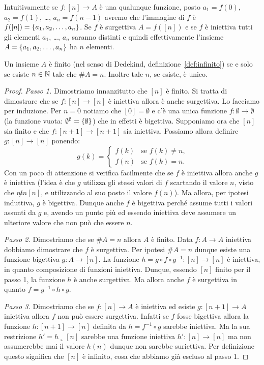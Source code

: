 Intuitivamente se $f\colon [n]\to A$ è una qualunque funzione, 
posto $a_1=f(0)$, $a_2=f(1)$, \dots, $a_{n}=f(n-1)$ 
avremo che l'immagine di $f$ è $f([n]) = {\left\{ a_1,a_2,\dots,a_n \right\}}$.
Se $f$ è surgettiva $A=f([n])$ e se $f$ è iniettiva 
tutti gli elementi $a_1$, \dots, $a_n$ saranno distinti
e quindi effettivamente l'insieme $A={\left\{ a_1,a_2,\dots,a_n \right\}}$
ha $n$ elementi.

\begin{theorem}
Un insieme $A$ è finito
(nel senso di Dedekind, definizione~\ref{def:infinito})
se e solo se esiste $n\in {\mathbb N}$ tale che $\#A = n$.
Inoltre tale $n$, se esiste, è unico.
\end{theorem}
\begin{proof}
\emph{Passo 1.} Dimostriamo innanzitutto che $[n]$ è finito.
Si tratta di dimostrare che se $f\colon [n]\to [n]$ è iniettiva allora è anche surgettiva.
Lo facciamo per induzione. 
Per $n=0$ notiamo che $[0]=\emptyset$ e c'è una unica funzione $f\colon \emptyset \to \emptyset$
(la funzione vuota: $\emptyset^\emptyset = {\left\{ \emptyset \right\}}$)
che in effetti è bigettiva.
Supponiamo ora che $[n]$ sia finito e che $f\colon [n+1]\to [n+1]$ sia iniettiva.
Possiamo allora definire $g\colon[n]\to[n]$ ponendo:
\[
  g(k) = \begin{cases}
    f(k) & \text{se $f(k)\neq n$,}\\
    f(n) & \text{se $f(k)=n$.}
  \end{cases}
\]
Con un poco di attenzione si verifica facilmente che se $f$ è iniettiva allora anche $g$ è iniettiva
(l'idea è che $g$ utilizza gli stessi valori di $f$ scartando il valore $n$, visto che $n\not in [n]$, 
e utilizzando al suo posto il valore $f(n)$).
Ma allora, per ipotesi induttiva, $g$ è bigettiva.
Dunque anche $f$ è bigettiva perché assume tutti i valori assunti da $g$  
e, avendo un punto più ed essendo iniettiva deve assumere un ulteriore valore che non può 
che essere $n$.

\emph{Passo 2.}
Dimostriamo che se $\#A=n$ allora $A$ è finito.
Data $f\colon A\to A$ iniettiva dobbiamo dimostrare che $f$ è surgettiva.
Per ipotesi $\#A=n$ dunque esiste una funzione bigettiva $g\colon A\to [n]$.
La funzione $h=g\circ f\circ g^{-1}\colon [n]\to [n]$ è iniettiva, in quanto composizione di funzioni iniettiva.
Dunque, essendo $[n]$ finito per il passo 1, la funzione $h$ è anche surgettiva.
Ma allora anche $f$ è surgettiva in quanto $f=g^{-1}\circ h\circ g$.

\emph{Passo 3.} Dimostriamo che se $f\colon[n]\to A$ è iniettiva
ed esiste $g\colon[n+1]\to A$ iniettiva allora $f$ non può 
essere surgettiva.
Infatti se $f$ fosse bigettiva allora la funzione
$h\colon [n+1]\to [n]$ definita da $h=f^{-1}\circ g$ 
sarebbe iniettiva.
Ma la sua restrizione $h'=h \llcorner [n]$ sarebbe una funzione
iniettiva $h'\colon[n]\to[n]$ ma non assumerebbe mai il valore 
$h(n)$ dunque non sarebbe suriettiva.
Per definizione questo significa che $[n]$ è infinito, 
cosa che abbiamo già escluso al passo 1.


\end{proof}
